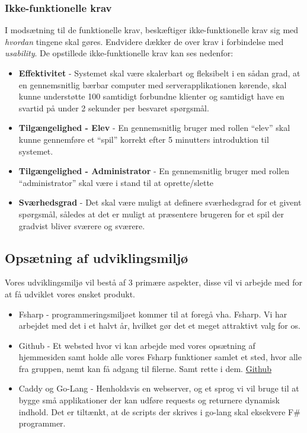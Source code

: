 \documentclass[12pt, a4paper]{article}
\begin{document}
\subsubsection{Ikke-funktionelle krav}
I modsætning til de funktionelle krav, beskæftiger ikke-funktionelle krav sig med \emph{hvordan} tingene skal gøres. Endvidere dækker de over krav i forbindelse med \emph{usability}. De opstillede ikke-funktionelle krav kan ses nedenfor:
\begin{itemize}
    \item \textbf{Effektivitet} - Systemet skal være skalerbart og fleksibelt i en sådan grad, at en gennemsnitlig bærbar computer med serverapplikationen kørende, skal kunne understøtte 100 samtidigt forbundne klienter og samtidigt have en svartid på under 2 sekunder per besvaret spørgsmål.
    \item \textbf{Tilgængelighed - Elev} - En gennemsnitlig bruger med rollen ``elev'' skal kunne gennemføre et ``spil'' korrekt efter 5 minutters introduktion til systemet.
    \item \textbf{Tilgængelighed - Administrator} - En gennemsnitlig bruger med rollen ``administrator'' skal være i stand til at oprette/slette 
    \item \textbf{Sværhedsgrad} - Det skal være muligt at definere sværhedsgrad for et givent spørgsmål, således at det er muligt at præsentere brugeren for et spil der gradvist bliver sværere og sværere.    
\end{itemize}

\subsection{Opsætning af udviklingsmiljø}
Vores udviklingsmiljø vil bestå af 3 primære aspekter, disse vil vi arbejde med for at få udviklet vores ønsket produkt.
\begin{itemize}
\item Fsharp - programmeringsmiljøet kommer til at foregå vha. Fsharp. Vi har arbejdet med det i et halvt år, hvilket gør det et meget attraktivt valg for os.
\item Github - Et websted hvor vi kan arbejde med vores opsætning af hjemmesiden samt holde alle vores Fsharp funktioner samlet et sted, hvor alle fra gruppen, nemt kan få adgang til filerne. Samt rette i dem. \href{https://github.com/Ambrodji/SU-MMJ}{Github}
\item Caddy og Go-Lang - Henholdsvis en webserver, og et sprog vi vil bruge til at bygge små applikationer der kan udføre requests og returnere dynamisk indhold. Det er tiltænkt, at de scripts der skrives i go-lang skal eksekvere F\# programmer.
\end{itemize}
\end{document}
